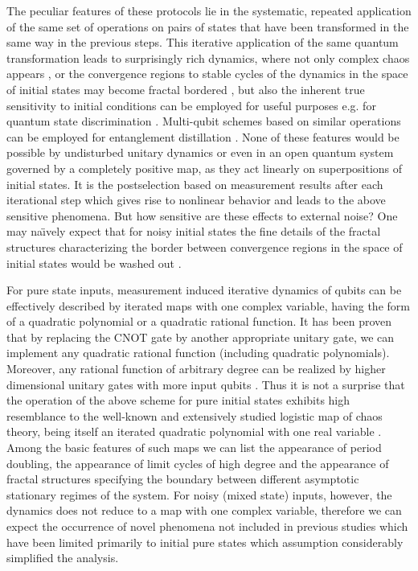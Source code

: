 \documentclass[%
 aip,
 amsmath,amssymb,
 reprint,%
]{revtex4-1}
\begin{document}
The peculiar features of these protocols lie in the systematic, repeated application of the same set of operations on pairs of states that have been transformed in the same way in the previous steps. This  iterative application of the same quantum transformation leads to surprisingly rich dynamics, where not only complex chaos appears \cite{Kiss2006}, or the convergence regions to stable cycles of the dynamics in the space of initial states may become fractal bordered \cite{Kiss2008}, but also the inherent true sensitivity to initial conditions can be employed for useful purposes e.g. for quantum state discrimination \cite{Paris,Torres,Kalman}.
Multi-qubit schemes based on similar operations can be employed for entanglement distillation \cite{Bennett97,Deutsch98,Alber,Kiss2011}. None of these features would be possible by undisturbed unitary dynamics \cite{Ballentine,Weinstein} or even in an open quantum system governed by a completely positive map, as they act linearly on superpositions of initial states. It is the postselection based on measurement results after each iterational step which gives rise to nonlinear behavior \cite{Terno1999,Totharxiv,Filippov2017} and leads to the above sensitive phenomena. But how sensitive are these effects to external noise? One may na\"\i vely expect that for noisy initial states the fine details of the fractal structures characterizing the border between convergence regions in the space of initial states would be washed out \cite{Guan2013,Kalmanarxiv}. 

For pure state inputs, measurement induced iterative dynamics of qubits can be effectively described by iterated maps with one complex variable, having the form of a quadratic polynomial or a quadratic rational function. It has been proven that by replacing the CNOT gate by another appropriate unitary gate, we can implement any quadratic rational function (including quadratic polynomials). Moreover, any rational function of arbitrary degree can be realized by higher dimensional unitary gates with more input qubits \cite{Andras}. Thus it is not a surprise that the operation of the above scheme for pure initial states exhibits high resemblance to the well-known and extensively studied logistic map of chaos theory, being itself an iterated quadratic polynomial with one real variable \cite{Log1,Log2,Milnor}.  Among the basic features of such maps we can list the appearance of period doubling, the appearance of limit cycles of high degree and the appearance of fractal structures specifying the boundary between different asymptotic stationary regimes of the system.
For noisy (mixed state) inputs, however, the dynamics does not reduce to a map with one complex variable, therefore we can expect the occurrence of novel phenomena not included in previous studies which have been limited primarily to initial pure states which assumption considerably simplified the analysis. 
\end{document}
